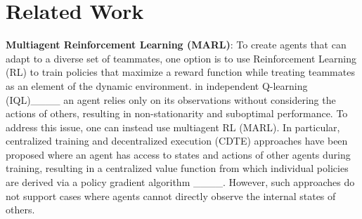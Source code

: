 \section{Related Work}
%
\label{Sec:Related}



\textbf{Multiagent Reinforcement Learning (MARL)}: To create agents that can adapt to a diverse set of teammates, one option is to use Reinforcement Learning (RL) to train policies that maximize a reward function while treating teammates as an element of the dynamic environment. \Eg in independent Q-learning (IQL)____ an agent relies only on its observations without considering the actions of others, resulting in non-stationarity and suboptimal performance. To address this issue, one can instead use multiagent RL (MARL). In particular, centralized training and decentralized execution (CDTE) approaches have been proposed \cite {lowe2017maac} where an agent has access to states and actions of other agents during training, resulting in a centralized value function from which individual policies are derived via a policy gradient algorithm ____. However, such approaches do not support cases where agents cannot directly observe the internal states of others. 

